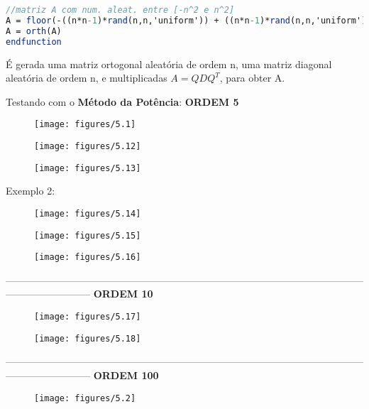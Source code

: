 \documentclass[leqno]{article}
\numberwithin{equation}{section}
\begin{document}
\begin{enumerate}
\begin{sol}
\begin{lstlisting}[style=mystyle, language=Scilab]
//matriz A com num. aleat. entre [-n^2 e n^2]
A = floor(-((n*n-1)*rand(n,n,'uniform')) + ((n*n-1)*rand(n,n,'uniform')))
A = orth(A)
endfunction
		\end{lstlisting}
	\end{sol}
	É gerada uma matriz ortogonal aleatória de ordem n, uma matriz diagonal aleatória de ordem n, e multiplicadas $A = QDQ^T$, para obter A.
	
	Testando com o \textbf{Método da Potência}:
	\newpage
	\textbf{{\large ORDEM 5}}
	\begin{figure}[H]
		\centering
		\texttt{[image: figures/5.1]}
		
	\end{figure}
	\begin{figure}[H]
		\centering
		\texttt{[image: figures/5.12]}
	\end{figure}
	\begin{figure}[H]
		\centering
		\texttt{[image: figures/5.13]}
	\end{figure}

	Exemplo 2:
		
	\begin{figure}[H]
		\centering
		\texttt{[image: figures/5.14]}
		
	\end{figure}
	\begin{figure}[H]
		\centering
		\texttt{[image: figures/5.15]}
	\end{figure}
	\begin{figure}[H]
		\centering
		\texttt{[image: figures/5.16]}
	\end{figure}
	
--------------------------------------------------------------------------------------------------------------------------------------
\newpage
	\textbf{{\large ORDEM 10}}
	\begin{figure}[H]
		\centering
		\texttt{[image: figures/5.17]}
	\end{figure}	

	\begin{figure}[H]
	\centering
	\texttt{[image: figures/5.18]}
\end{figure}		

--------------------------------------------------------------------------------------------------------------------------------------
\newpage
	\textbf{{\large ORDEM 100}}
	\begin{figure}[H]
		\centering
		\texttt{[image: figures/5.2]}
	\end{figure}	
	\end{enumerate}
\end{document}
